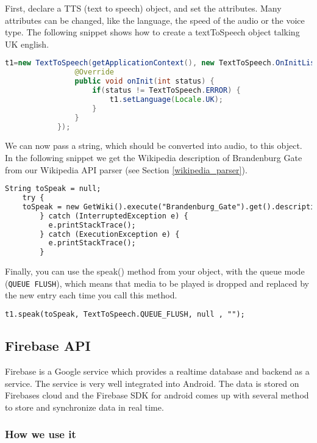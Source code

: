 First, declare a TTS (text to speech) object, and set the attributes. Many attributes can be changed, like the language, the speed of the audio or the voice type. The following snippet shows how to create a textToSpeech object talking UK english.
\begin{lstlisting}[language=Java, basicstyle=\scriptsize]
    t1=new TextToSpeech(getApplicationContext(), new TextToSpeech.OnInitListener() {
                @Override
                public void onInit(int status) {
                    if(status != TextToSpeech.ERROR) {
                        t1.setLanguage(Locale.UK);
                    }
                }
            });
\end{lstlisting}

We can now pass a string, which should be converted into audio, to this object. In the following snippet we get the Wikipedia description of Brandenburg Gate from our Wikipedia API parser (see Section \ref{wikipedia_parser}).
\begin{lstlisting}[language=XML, basicstyle=\scriptsize]
    String toSpeak = null;
    try {
    toSpeak = new GetWiki().execute("Brandenburg_Gate").get().description;
        } catch (InterruptedException e) {
          e.printStackTrace();
        } catch (ExecutionException e) {
          e.printStackTrace();
        }
\end{lstlisting}

Finally, you can use the speak() method from your object, with the queue mode (\texttt{QUEUE FLUSH}), which means that media to be played is dropped and replaced by the new entry each time you call this method.

\begin{lstlisting}[language=XML, basicstyle=\scriptsize]
    t1.speak(toSpeak, TextToSpeech.QUEUE_FLUSH, null , "");
\end{lstlisting}

\subsection{Firebase API}
Firebase is a Google service which provides a realtime database and backend as a service. The service is very well integrated into Android. The data is stored on Firebases cloud and the Firebase SDK for android comes up with several method to store and synchronize data in real time.

\subsubsection{How we use it}

